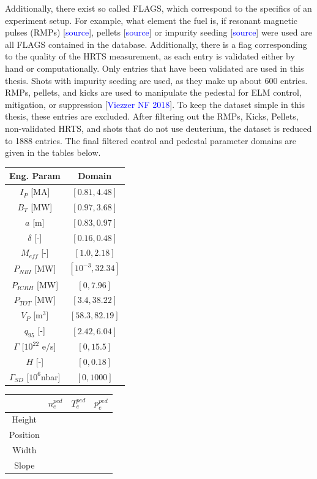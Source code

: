 \documentclass[a4paper, twoside, final, 12pt]{article}
\begin{document}
Additionally, there exist so called FLAGS, which correspond to the specifics of an experiment setup.
For example, what element the fuel is, if resonant magnetic pulses (RMPs) [\textcolor{blue}{source}], pellets [\textcolor{blue}{source}] or impurity seeding [\textcolor{blue}{source}] were used are all FLAGS contained in the database.
Additionally, there is a flag corresponding to the quality of the HRTS measurement, as each entry is validated either by hand or computationally.
Only entries that have been validated are used in this thesis.
Shots with impurity seeding are used, as they make up about 600 entries.
RMPs, pellets, and kicks are used to manipulate the pedestal for ELM control, mitigation, or suppression [\textcolor{blue}{Viezzer NF 2018}].
To keep the dataset simple in this thesis, these entries are excluded.
After filtering out the RMPs, Kicks, Pellets, non-validated HRTS, and shots that do not use deuterium, the dataset is reduced to 1888 entries. The final filtered control and pedestal parameter domains are given in the tables below.
\begin{center}
\begin{tabular}{| c | c | }
	\hline
	Eng. Param & Domain \\
	\hline
	$I_P$ [MA] & $[0.81, 4.48]$ \\
	$B_T$ [MW] & $[0.97, 3.68]$ \\
	$a$ [m] & $[0.83, 0.97]$ \\
	$\delta$ [-] & $[0.16, 0.48]$ \\
	$M_{eff}$ [-] & $[1.0, 2.18]$ \\
	$P_{NBI}$ [MW] & $[10^{-3}, 32.34]$ \\
	$P_{ICRH}$ [MW] & $[0, 7.96]$ \\
	$P_{TOT}$ [MW] & $[3.4, 38.22]$ \\
	$V_P$ [m$^3$] &  $[58.3, 82.19]$ \\
	$q_{95}$ [-] & $[2.42, 6.04]$ \\
	$\Gamma$ [$10^{22}$ e/s] & $[0, 15.5]$ \\
	$H$ [-] & $[0, 0.18]$ \\
	$\Gamma_{SD}$ [$10^6$nbar] & $[0,1000]$ \\
	\hline
\end{tabular}
	\quad\quad
\begin{tabular}{ | c | c | c | c | }
	\hline
	& $n_e^{ped}$ & $T_e^{ped}$ & $p_e^{ped}$ \\
	\hline
	Height & & & \\
	Position & & & \\
	Width & & & \\
	Slope & & & \\
	\hline
\end{tabular}
\end{center}
\end{document}
